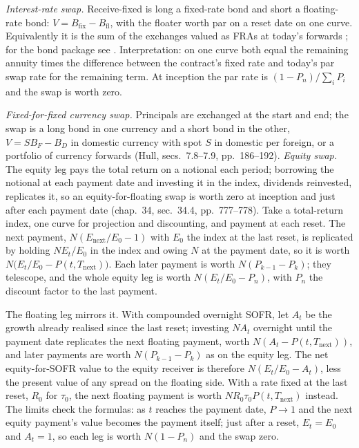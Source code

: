 \begin{qfmethod}\label{meth:swap-valuation-replication}
 \emph{Interest-rate swap.} Receive-fixed is long a fixed-rate bond and short a floating-rate bond: $V=B_{\text{fix}}-B_{\text{fl}}$, with the floater worth par on a reset date on one curve. Equivalently it is the sum of the exchanges valued as FRAs at today's forwards \citep[chap.~7, sec.~7.6, pp.~183--185]{s7-hulloptions}; for the bond package see \citep[chap.~64, pp.~1577--1578]{s7-fabozzifixed}. Interpretation: on one curve both equal the remaining annuity times the difference between the contract's fixed rate and today's par swap rate for the remaining term. At inception the par rate is $(1-P_n)/\sum_iP_i$ and the swap is worth zero.

\emph{Fixed-for-fixed currency swap.} Principals are exchanged at the start and end; the swap is a long bond in one currency and a short bond in the other, $V=SB_F-B_D$ in domestic currency with spot $S$ in domestic per foreign, or a portfolio of currency forwards (Hull, secs.~7.8--7.9, pp.~186--192). \emph{Equity swap.} The equity leg pays the total return on a notional each period; borrowing the notional at each payment date and investing it in the index, dividends reinvested, replicates it, so an equity-for-floating swap is worth zero at inception and just after each payment date (chap.~34, sec.~34.4, pp.~777--778). Take a total-return index, one curve for projection and discounting, and payment at each reset. The next payment, $N(E_{\text{next}}/E_0-1)$ with $E_0$ the index at the last reset, is replicated by holding $NE_t/E_0$ in the index and owing $N$ at the payment date, so it is worth $N\bigl(E_t/E_0-P(t,T_{\text{next}})\bigr)$. Each later payment is worth $N(P_{k-1}-P_k)$; they telescope, and the whole equity leg is worth $N(E_t/E_0-P_n)$, with $P_n$ the discount factor to the last payment.

The floating leg mirrors it. With compounded overnight SOFR, let $A_t$ be the growth already realised since the last reset; investing $NA_t$ overnight until the payment date replicates the next floating payment, worth $N(A_t-P(t,T_{\text{next}}))$, and later payments are worth $N(P_{k-1}-P_k)$ as on the equity leg. The net equity-for-SOFR value to the equity receiver is therefore $N(E_t/E_0-A_t)$, less the present value of any spread on the floating side. With a rate fixed at the last reset, $R_0$ for $\tau_0$, the next floating payment is worth $NR_0\tau_0P(t,T_{\text{next}})$ instead. The limits check the formulas: as $t$ reaches the payment date, $P\to1$ and the next equity payment's value becomes the payment itself; just after a reset, $E_t=E_0$ and $A_t=1$, so each leg is worth $N(1-P_n)$ and the swap zero.


\end{qfmethod}
